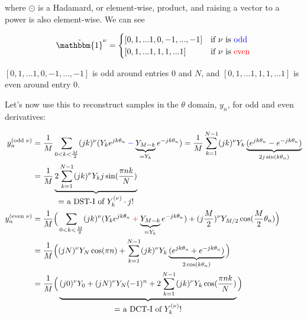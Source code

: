 \documentclass[10pt]{article}
\begin{document}
where $\odot$ is a Hadamard, or element-wise, product, and raising a vector to a power is also element-wise. We can see

$$\tilde{\mathbbm{1}}^\nu = \begin{cases} [0, 1, ... 1, 0, -1, ..., -1] & \text{if $\nu$ is \color{blue}odd}\\ [0, 1, ... 1, 1, 1, ... 1] & \text{if $\nu$ is \color{red}even}\end{cases}$$

$[0, 1, ... 1, 0, -1, ..., -1]$ is odd around entries $0$ and $N$, and $[0, 1, ... 1, 1, 1, ... 1]$ is even around entry $0$.\newline

Let's now use this to reconstruct samples in the $\theta$ domain, $y_n$, for odd and even derivatives:

\begin{align}
y_n^{(\text{odd } \nu)} &= \frac{1}{M} \sum_{0 < k < \frac{M}{2}} (jk)^\nu (Y_k e^{jk\theta_n} \color{blue}-\color{black} \underbrace{Y_{M-k}}_{= Y_k} e^{-jk\theta_n}) = \frac{1}{M} \sum_{k=1}^{N-1} (jk)^\nu Y_k \underbrace{(e^{jk\theta_n} - e^{-jk\theta_n})}_{2j\sin(k\theta_n)} \notag \\
&= \frac{1}{M} \underbrace{2 \sum_{k=1}^{N-1} (jk)^\nu Y_k j \sin(\frac{\pi nk}{N})}_{\text{\normalsize = a DST-I of $Y_k^{(\nu)} \cdot j$!}} \label{y_prime_odd}\\
y_n^{(\text{even } \nu)} &= \frac{1}{M} \Big( \sum_{0 < k < \frac{M}{2}} (jk)^\nu (Y_k e^{jk\theta_n} \color{red}+\color{black} \underbrace{Y_{M-k}}_{= Y_k} e^{-jk\theta_n}) + (j\frac{M}{2})^\nu Y_{M/2} \cos(\frac{M}{2}\theta_n) \Big) \notag \\
&= \frac{1}{M} \Big( (jN)^\nu Y_N \cos(\pi n) + \sum_{k=1}^{N-1} (jk)^\nu Y_k \underbrace{(e^{jk\theta_n} + e^{-jk\theta_n})}_{2\cos(k\theta_n)} \Big) \notag \\
&= \frac{1}{M} \Big( \underbrace{(j0)^\nu Y_0 + (jN)^\nu Y_N (-1)^n + 2 \sum_{k=1}^{N-1} (jk)^\nu Y_k \cos(\frac{\pi nk}{N})}_{\text{\normalsize = a DCT-I of $Y_k^{(\nu)}$!}} \Big) \label{y_prime_even}
\end{align}
\end{document}
